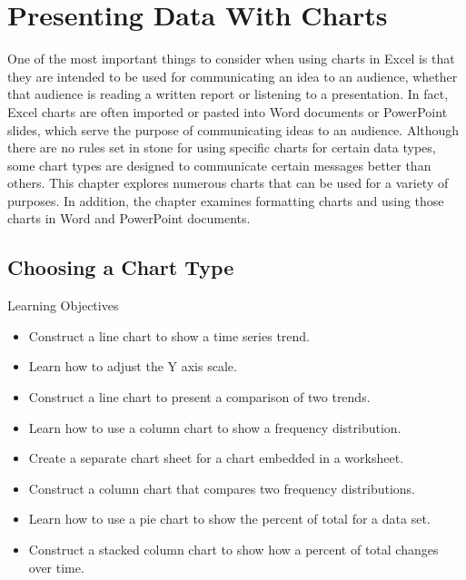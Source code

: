 \chapter{Presenting Data With Charts}\label{ch04:charts}

One of the most important things to consider when using charts in Excel is that they are intended to be used for communicating an idea to an audience, whether that audience is reading a written report or listening to a presentation. In fact, Excel charts are often imported or pasted into Word documents or PowerPoint slides, which serve the purpose of communicating ideas to an audience. Although there are no rules set in stone for using specific charts for certain data types, some chart types are designed to communicate certain messages better than others. This chapter explores numerous charts that can be used for a variety of purposes. In addition, the chapter examines formatting charts and using those charts in Word and PowerPoint documents.

\section{Choosing a Chart Type}

\begin{center}
	\begin{objbox}{Learning Objectives}
		\begin{itemize}
			\setlength{\itemsep}{0pt}
			\setlength{\parskip}{0pt}
			\setlength{\parsep}{0pt}

			\item Construct a line chart to show a time series trend.
			\item Learn how to adjust the Y axis scale.
			\item Construct a line chart to present a comparison of two trends.
			\item Learn how to use a column chart to show a frequency distribution.
			\item Create a separate chart sheet for a chart embedded in a worksheet.
			\item Construct a column chart that compares two frequency distributions.
			\item Learn how to use a pie chart to show the percent of total for a data set.
			\item Construct a stacked column chart to show how a percent of total changes over time.
			
		\end{itemize}
	\end{objbox}
\end{center}

